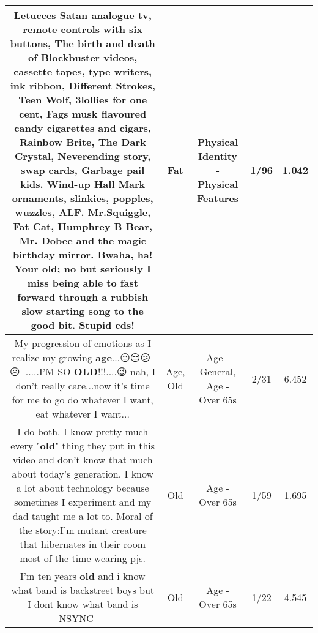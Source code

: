 \documentclass[11pt]{article}
\newlength\mylength
\begin{document}
\begin{center}
\begin{longtable}{|C{.65\mylength}|C{.30\mylength}|C{.12\mylength}|C{.12\mylength}|C{.12\mylength}|}
  \small Letucces Satan analogue tv, remote controls with six buttons, The birth and death of Blockbuster videos, cassette tapes, type writers, ink ribbon, Different Strokes, Teen Wolf, 3lollies for one cent, Fags musk flavoured candy cigarettes and cigars, Rainbow Brite, The Dark Crystal, Neverending story, swap cards, Garbage pail kids. Wind-up Hall Mark ornaments, slinkies, popples, wuzzles, ALF. Mr.Squiggle, \textbf{Fat} Cat, Humphrey B Bear, Mr. Dobee and the magic birthday mirror. Bwaha, ha! Your old; no but seriously I miss being able to fast forward through a rubbish slow starting song to the good bit. Stupid cds!\normalsize   & Fat & Physical Identity - Physical Features & 1/96 & 1.042 \\  \hline
  \small My progression of emotions as I realize my growing \textbf{age}...😐😑😕🙁☹️🥺😩.....I'M SO \textbf{OLD}!!!....😉  nah, I don't really care...now it's time for me to go do whatever I want, eat whatever I want...\normalsize   & Age, Old & Age - General, Age - Over 65s & 2/31 & 6.452 \\  \hline
  \small I do both. I know pretty much every "\textbf{old}" thing they put in this video and don't know that much about today's generation. I know a lot about technology because sometimes I experiment and my dad taught me a lot to. Moral of the story:I'm mutant creature that hibernates in their room most of the time wearing pjs.\normalsize   & Old & Age - Over 65s & 1/59 & 1.695 \\  \hline
  \small I'm ten years \textbf{old} and i know what band is backstreet boys but I dont know what band is NSYNC -  -\normalsize   & Old & Age - Over 65s & 1/22 & 4.545 \\  \hline

\end{longtable}
\end{center}
\end{document}
